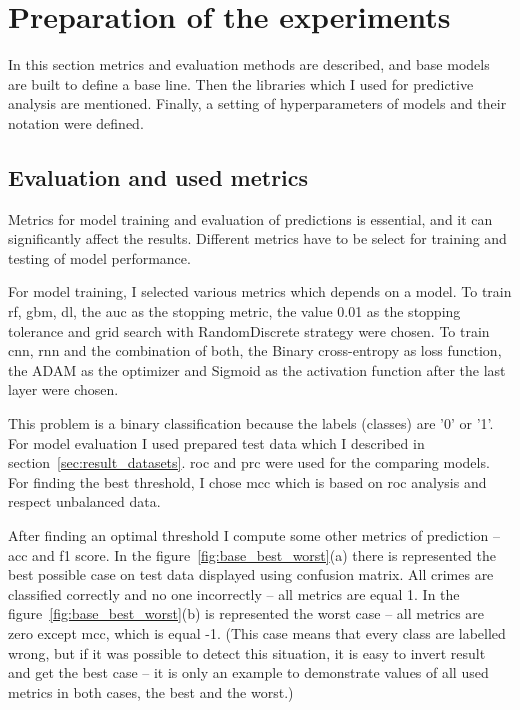 \documentclass[thesis=M,english]{FITthesis}[2012/10/20]
\begin{document}
\section{Preparation of the experiments}\label{sec:preparation}

In this section metrics and evaluation methods are described, and base models are built to define a base line. Then the libraries which I used for predictive analysis are mentioned. Finally, a setting of hyperparameters of models and their notation were defined. 

\subsection{Evaluation and used metrics}
 
Metrics for model training and evaluation of predictions is essential, and it can significantly affect the results. Different metrics have to be select for training and testing of model performance. 
 
For model training, I selected various metrics which depends on a model. To train \gls{rf}, \gls{gbm}, \gls{dl}, the \gls{auc} as the stopping metric, the value 0.01 as the stopping tolerance and grid search with RandomDiscrete strategy were chosen. To train \gls{cnn}, \gls{rnn} and the combination of both, the Binary cross-entropy as loss function, the ADAM as the optimizer and Sigmoid as the activation function after the last layer were chosen. 

This problem is a binary classification because the labels (classes) are '0' or '1'. For model evaluation I used prepared test data which I described in section~\ref{sec:result_datasets}. \gls{roc} and \gls{prc} were used for the comparing models. For finding the best threshold, I chose \gls{mcc} which is based on \gls{roc} analysis and respect unbalanced data.  

After finding an optimal threshold I compute some other metrics of prediction -- \gls{acc} and \gls{f1} score. In the figure~\ref{fig:base_best_worst}(a) there is represented the best possible case on test data displayed using confusion matrix. All crimes are classified correctly and no one incorrectly -- all metrics are equal 1. In the figure~\ref{fig:base_best_worst}(b) is represented the worst case -- all metrics are zero except \gls{mcc}, which is equal -1. (This case means that every class are labelled wrong, but if it was possible to detect this situation, it is easy to invert result and get the best case -- it is only an example to demonstrate values of all used metrics in both cases, the best and the worst.) 
\end{document}
